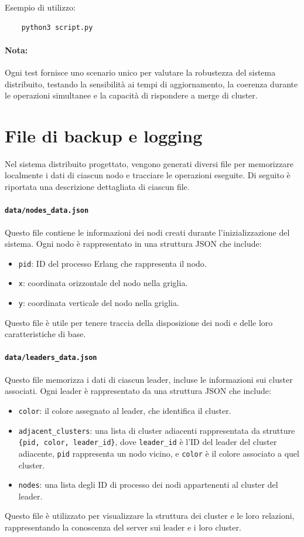 \documentclass[12pt, a4paper]{report}
\begin{document}
Esempio di utilizzo:
\begin{verbatim}
    python3 script.py
\end{verbatim}


\paragraph{Nota:}
Ogni test fornisce uno scenario unico per valutare la robustezza del sistema distribuito, testando la sensibilità ai tempi di aggiornamento, la coerenza durante le operazioni simultanee e la capacità di rispondere a merge di cluster.

\section{File di backup e logging}

Nel sistema distribuito progettato, vengono generati diversi file per memorizzare localmente i dati di ciascun nodo e tracciare le operazioni eseguite. Di seguito \`e riportata una descrizione dettagliata di ciascun file.

\paragraph{\texttt{data/nodes\_data.json}} Questo file contiene le informazioni dei nodi creati durante l'inizializzazione del sistema. Ogni nodo \`e rappresentato in una struttura JSON che include:
\begin{itemize}
    \item \texttt{pid}: ID del processo Erlang che rappresenta il nodo.
    \item \texttt{x}: coordinata orizzontale del nodo nella griglia.
    \item \texttt{y}: coordinata verticale del nodo nella griglia.
\end{itemize}
Questo file \`e utile per tenere traccia della disposizione dei nodi e delle loro caratteristiche di base.

\paragraph{\texttt{data/leaders\_data.json}} Questo file memorizza i dati di ciascun leader, incluse le informazioni sui cluster associati. Ogni leader \`e rappresentato da una struttura JSON che include:
\begin{itemize}
    \item \texttt{color}: il colore assegnato al leader, che identifica il cluster.
    \item \texttt{adjacent\_clusters}: una lista di cluster adiacenti rappresentata da strutture \texttt{\{pid, color, leader\_id\}}, dove \texttt{leader\_id} \`e l'ID del leader del cluster adiacente, \texttt{pid} rappresenta un nodo vicino, e \texttt{color} \`e il colore associato a quel cluster.
    \item \texttt{nodes}: una lista degli ID di processo dei nodi appartenenti al cluster del leader.
\end{itemize}
Questo file \`e utilizzato per visualizzare la struttura dei cluster e le loro relazioni, rappresentando la conoscenza del server sui leader e i loro cluster.
\end{document}
